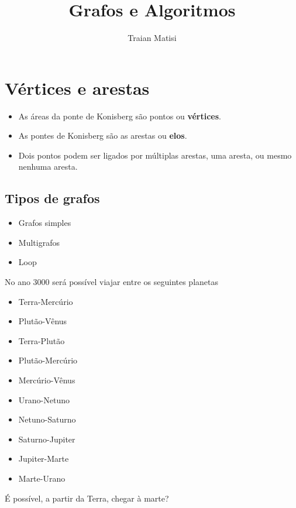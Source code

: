 \documentclass[12pt,a4paper]{article} %
\author{Traian Matisi}
\title{Grafos e Algoritmos}
\begin{document}
\maketitle
\section{Vértices e arestas}
\begin{itemize}
\item As áreas da ponte de Konisberg são pontos ou \textbf{vértices}.
\item As pontes de Konisberg são as arestas ou \textbf{elos}.
\item Dois pontos podem ser ligados por múltiplas arestas, uma aresta, ou mesmo nenhuma aresta.
\end{itemize}
\subsection{Tipos de grafos}
\begin{itemize}
\item Grafos simples
\item Multigrafos
\item Loop
\end{itemize}
No ano 3000 será possível viajar entre os seguintes planetas
\begin{itemize}
\item Terra-Mercúrio
\item Plutão-Vênus
\item Terra-Plutão
\item Plutão-Mercúrio
\item Mercúrio-Vênus
\item Urano-Netuno
\item Netuno-Saturno
\item Saturno-Jupiter
\item Jupiter-Marte
\item Marte-Urano
\end{itemize}
É possível, a partir da Terra, chegar à marte?
\end{document}
